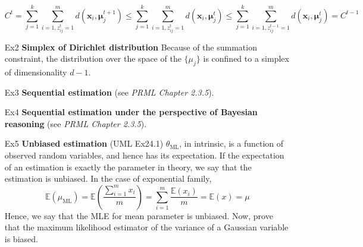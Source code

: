 \documentclass{article}
\begin{document}
\begin{itemize}
	\begin{equation*}
	C^t = \sum_{j=1}^k \sum_{i=1, z^t_{ij}=1}^m d(\bm{x}_i, \bm{\mu}^{t+1}_j) \leq \sum_{j=1}^k \sum_{i=1, z^t_{ij}=1}^m d(\bm{x}_i, \bm{\mu}^t_j)  \leq \sum_{j=1}^k \sum_{i=1, z^{t-1}_{ij}=1}^m d(\bm{x}_i, \bm{\mu}^t_j) = C^{t-1}
	\end{equation*}

\item[Ex2] \textbf{Simplex of Dirichlet distribution} Because of the summation constraint, the distribution over the space of the $\{\mu_j\}$ is confined to a simplex of dimensionality $d-1$.

\item[Ex3] \textbf{Sequential estimation} (see \textit{PRML Chapter 2.3.5}).

\item[Ex4] \textbf{Sequential estimation under the perspective of Bayesian reasoning} (see \textit{PRML Chapter 2.3.5}).

\item[Ex5] \textbf{Unbiased estimation} (UML Ex24.1) $\theta_{\mathrm{ML}}$, in intrinsic, is a function of observed random variables, and hence has its expectation. If the expectation of an estimation is exactly the parameter in theory, we say that the estimation is unbiased. In the case of exponential family, 
	\begin{equation*} 
	\mathbb{E} (\mu_\mathrm{ML}) = \mathbb{E} \left(\frac{\sum_{i=1}^m x_i}{m}\right) =  \sum_{i=1}^m  \frac{\mathbb{E}(x_i)}{m} = \mathbb{E}(x) = \mu
	\end{equation*}
Hence, we say that the MLE for mean parameter is unbiased. Now, prove that the maximum likelihood estimator of the variance of a Gaussian variable is biased.


\end{itemize}
\end{document}
